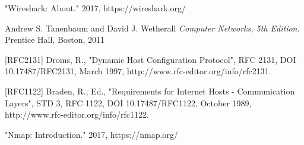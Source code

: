 \documentclass[10pt]{IEEEtran}
\begin{document}
 
\begin{thebibliography}{1}

"Wireshark: About." 2017, https://wireshark.org/

Andrew S. Tanenbaum and David J. Wetherall
\textit{Computer Networks, 5th Edition}. Prentice Hall, Boston, 2011

[RFC2131] Droms, R., "Dynamic Host Configuration Protocol", RFC 2131, DOI 10.17487/RFC2131, March 1997, http://www.rfc-editor.org/info/rfc2131.

[RFC1122] Braden, R., Ed., "Requirements for Internet Hosts - Communication Layers", STD 3, RFC 1122, DOI 10.17487/RFC1122, October 1989, http://www.rfc-editor.org/info/rfc1122.

"Nmap: Introduction." 2017, https://nmap.org/

\end{thebibliography}

\newpage
\end{document}
